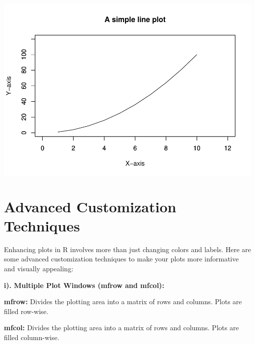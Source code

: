 \documentclass[
]{book}
\begin{document}
\includegraphics{_main_files/figure-latex/unnamed-chunk-46-1.pdf}

\section{Advanced Customization Techniques}\label{advanced-customization-techniques}

Enhancing plots in R involves more than just changing colors and labels. Here are some advanced customization techniques to make your plots more informative and visually appealing:

\textbf{i). Multiple Plot Windows (mfrow and mfcol):}

\textbf{mfrow:} Divides the plotting area into a matrix of rows and columns. Plots are filled row-wise.

\textbf{mfcol:} Divides the plotting area into a matrix of rows and columns. Plots are filled column-wise.
\end{document}
